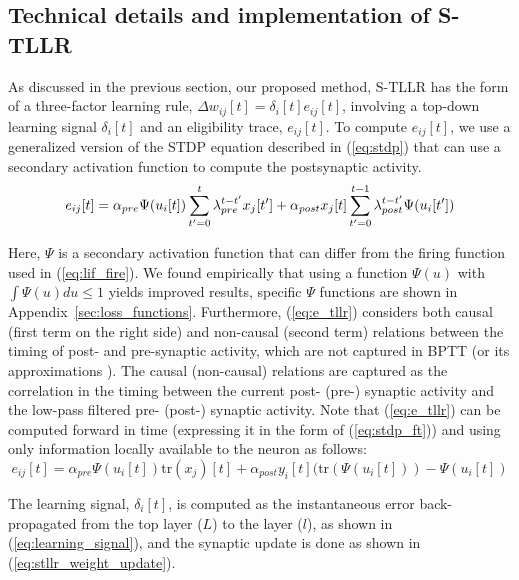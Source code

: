 \documentclass[10pt]{article} %
\begin{document}
    
    \subsection{Technical details and implementation of S-TLLR}\label{sec:tllr_implementation}
    As discussed in the previous section, our proposed method, S-TLLR has the form of a three-factor learning rule, $\Delta w_{ij}[t]=\delta_i[t]e_{ij}[t]$, involving a top-down learning signal $\delta_i[t]$ and an eligibility trace, $e_{ij}[t]$.
    To compute $e_{ij}[t]$, we use a generalized version of the  STDP equation described in (\ref{eq:stdp}) that can use a secondary activation function to compute the postsynaptic activity.
    \begin{equation}
        \label{eq:e_tllr}
        e_{ij}[t] = \alpha_{pre}\Psi(u_i[t])\sum_{t'=0}^{t}\lambda_{pre}^{t-t'}  x_j[t'] 
        \\+ \alpha_{post} x_j[t]\sum_{t'=0}^{t-1}\lambda_{post}^{t-t'} \Psi(u_i[t'])
    \end{equation}
         
    Here, $\Psi$ is a secondary activation function that can differ from the firing function used in (\ref{eq:lif_fire}). 
    We found empirically that using a function $\Psi(u)$ with $\int \Psi(u) du \leq 1$ yields improved results, specific $\Psi$ functions are shown in Appendix~\ref{sec:loss_functions}.
    Furthermore, (\ref{eq:e_tllr}) considers both causal (first term on the right side) and non-causal (second term) relations between the timing of post- and pre-synaptic activity, which are not captured in BPTT (or its approximations \citep{Bellec2020ANeurons, Bohnstingl2022OnlineNetworks, Xiao2022OnlineNetworks}). 
    The causal (non-causal) relations are captured as the correlation in the timing between the current post- (pre-) synaptic activity and the low-pass filtered pre- (post-) synaptic activity. 
    Note that (\ref{eq:e_tllr}) can be computed forward in time (expressing it in the form of (\ref{eq:stdp_ft})) and using only information locally available to the neuron as follows:
    \begin{equation}
        \label{eq:e_tllr_forward_time}
        e_{ij}[t] = \alpha_{pre}\Psi(u_i[t])\mathrm{tr}(x_j)[t]+ \alpha_{post} y_i[t](\mathrm{tr}(\Psi(u_i[t])) - \Psi(u_i[t])
    \end{equation}

    The learning signal, $\delta_i[t]$, is computed as the instantaneous error back-propagated from the top layer ($L$) to the layer ($l$), as shown in (\ref{eq:learning_signal}), and the synaptic update is done as shown in (\ref{eq:stllr_weight_update}).
    
\end{document}

